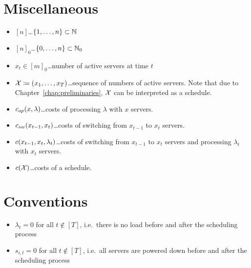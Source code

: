 \section*{Miscellaneous}
\begin{itemize}
	\item $[n]$\ldots$\{1,\dotsc,n\}\subset\mathbb{N}$
	\item $[n]_0$\ldots$\{0,\dotsc,n\}\subset\mathbb{N}_0$
	\item $x_t\in[m]_0$\ldots number of active servers at time $t$
	\item $\mathcal{X}\coloneqq(x_1,\ldots,x_T)$\ldots sequence of numbers of active servers. Note that due to Chapter~\ref{chap:preliminaries}, $\mathcal{X}$ can be interpreted as a schedule.
	\item $c_{op}(x,\lambda)$\ldots costs of processing $\lambda$ with $x$ servers.
	\item $c_{sw}(x_{t-1},x_{t})$\ldots costs of switching from $x_{t-1}$ to $x_t$ servers.
	\item $c(x_{t-1},x_{t},\lambda_t)$\ldots costs of switching from $x_{t-1}$ to $x_t$ servers and processing $\lambda_t$ with $x_t$ servers.
	\item $c(\mathcal{X})$\ldots costs of a schedule.
\end{itemize}

\section*{Conventions}
\begin{itemize}
	\item $\lambda_{t}=0$ for all $t\notin[T]$, i.e.\ there is no load before and after the scheduling process
	\item $s_{i,t}=0$ for all $t\notin[T]$, i.e.\ all servers are powered down before and after the scheduling process
\end{itemize}
